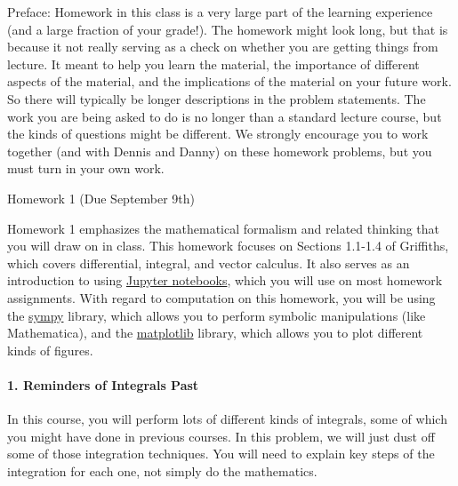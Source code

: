 \documentclass[11pt]{article}
\begin{document}
Preface: Homework in this class is a very large part of the learning
experience (and a large fraction of your grade!). The homework might
look long, but that is because it not really serving as a check on
whether you are getting things from lecture. It meant to help you learn
the material, the importance of different aspects of the material, and
the implications of the material on your future work. So there will
typically be longer descriptions in the problem statements. The work you
are being asked to do is no longer than a standard lecture course, but
the kinds of questions might be different. We strongly encourage you to
work together (and with Dennis and Danny) on these homework problems,
but you must turn in your own work.

{\LARGE Homework 1 (Due September
9th)}\label{homework-1-due-september-9th}

Homework 1 emphasizes the mathematical formalism and related thinking
that you will draw on in class. This homework focuses on Sections
1.1-1.4 of Griffiths, which covers differential, integral, and vector
calculus. It also serves as an introduction to using
\href{http://jupyter.org}{Jupyter notebooks}, which you will use on most
homework assignments. With regard to computation on this homework, you
will be using the \href{http://sympy.org}{sympy} library, which allows
you to perform symbolic manipulations (like Mathematica), and the
\href{http://matplotlib.org/}{matplotlib} library, which allows you to
plot different kinds of figures.

\paragraph{1. Reminders of Integrals
Past}\label{reminders-of-integrals-past}

In this course, you will perform lots of different kinds of integrals,
some of which you might have done in previous courses. In this problem,
we will just dust off some of those integration techniques. You will
need to explain key steps of the integration for each one, not simply do
the mathematics.
\end{document}
